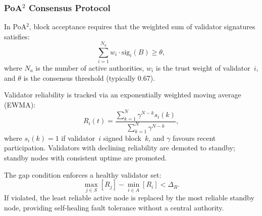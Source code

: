 \documentclass[conference]{IEEEtran}
\begin{document}
\begin{table}[!t]
\centering
\caption{Live PureChain validator set queried at
  block~1{,}012{,}544.}
\label{tab:validators}
\end{table}

\subsubsection{PoA$^2$ Consensus Protocol}

In PoA$^2$, block acceptance requires that the weighted
sum of validator signatures satisfies:
\begin{equation}
\label{poa}
\sum_{i=1}^{N_a} w_i \cdot \mathrm{sig}_i(B) \ge \theta,
\end{equation}
where $N_a$ is the number of active authorities,
$w_i$ is the trust weight of validator~$i$, and $\theta$
is the consensus threshold (typically 0.67).

Validator reliability is tracked via an exponentially
weighted moving average (EWMA):
\begin{equation}
\label{validator}
R_i(t) =
\frac{\sum_{k=1}^{N}\gamma^{N-k}s_i(k)}
     {\sum_{k=1}^{N}\gamma^{N-k}},
\end{equation}
where $s_i(k)=1$ if validator~$i$ signed block~$k$,
and $\gamma$ favours recent participation.
Validators with declining reliability are demoted to
standby; standby nodes with consistent uptime are promoted.

The gap condition enforces a healthy validator set:
\begin{equation}
\label{eq:gap}
\max_{j\in S}[R_j] - \min_{i\in A}[R_i] < \Delta_R.
\end{equation}
If violated, the least reliable active node is replaced
by the most reliable standby node, providing self-healing
fault tolerance without a central authority.
\end{document}
